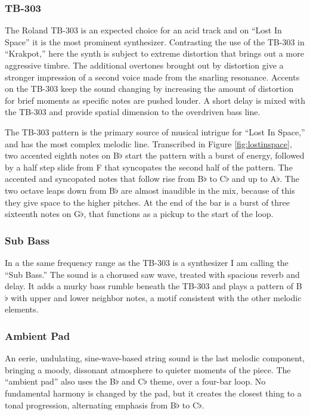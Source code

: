 \documentclass[12pt,twoside]{reedthesis}
\begin{document}
\subsubsection{TB-303}

The Roland TB-303 is an expected choice for an acid track and on ``Lost In Space'' it is the most prominent synthesizer. Contrasting the use of the TB-303 in ``Krakpot,'' here the synth is subject to extreme distortion that brings out a more aggressive timbre. The additional overtones brought out by distortion give a stronger impression of a second voice made from the snarling resonance. Accents on the TB-303 keep the sound changing by increasing the amount of distortion for brief moments as specific notes are pushed louder. A short delay is mixed with the TB-303 and provide spatial dimension to the overdriven bass line.

The TB-303 pattern is the primary source of musical intrigue for ``Lost In Space,'' and has the most complex melodic line. Transcribed in Figure \ref{fig:lostinspace}, two accented eighth notes on B$\flat$ start the pattern with a burst of energy, followed by a half step slide from F that syncopates the second half of the pattern. The accented and syncopated notes that follow rise from B$\flat$ to C$\flat$ and up to A$\flat$. The two octave leaps down from B$\flat$ are almost inaudible in the mix, because of this they give space to the higher pitches. At the end of the bar is a burst of three sixteenth notes on G$\flat$, that functions as a pickup to the start of the loop.

\subsubsection{Sub Bass}

In a the same frequency range as the TB-303 is a synthesizer I am calling the ``Sub Bass.'' The sound is a chorused saw wave, treated with spacious reverb and delay. It adds a murky bass rumble beneath the TB-303 and plays a pattern of B$\flat$ with upper and lower neighbor notes, a motif consistent with the other melodic elements.

\subsubsection{Ambient Pad}

An eerie, undulating, sine-wave-based string sound is the last melodic component, bringing a moody, dissonant atmosphere to quieter moments of the piece. The ``ambient pad'' also uses the B$\flat$ and C$\flat$ theme, over a four-bar loop. No fundamental harmony is changed by the pad, but it creates the closest thing to a tonal progression, alternating emphasis from B$\flat$ to C$\flat$.
\end{document}
